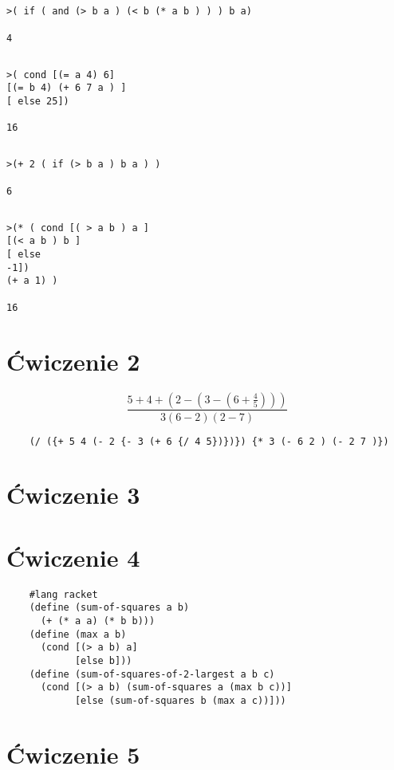\documentclass[a4paper]{article}
\begin{document}
\subsection{}
\begin{lstlisting}
>( if ( and (> b a ) (< b (* a b ) ) ) b a)

4
\end{lstlisting}
\subsection{}
\begin{lstlisting}
>( cond [(= a 4) 6]
[(= b 4) (+ 6 7 a ) ]
[ else 25])

16
\end{lstlisting}
\subsection{}
\begin{lstlisting}
>(+ 2 ( if (> b a ) b a ) )

6
\end{lstlisting}
\subsection{}
\begin{lstlisting}
>(* ( cond [( > a b ) a ]
[(< a b ) b ]
[ else
-1])
(+ a 1) )

16
\end{lstlisting}

\section{Ćwiczenie 2}
\begin{center}
    $$ \frac{5+4+(2-(3-(6+\frac{4}{5})))}{3(6-2)(2-7)} $$
\begin{lstlisting}
    (/ ({+ 5 4 (- 2 {- 3 (+ 6 {/ 4 5})})}) {* 3 (- 6 2 ) (- 2 7 )})
\end{lstlisting}
\end{center}
\section{Ćwiczenie 3}
\clearpage
\section{Ćwiczenie 4}
\begin{lstlisting}
    #lang racket
    (define (sum-of-squares a b)
      (+ (* a a) (* b b)))
    (define (max a b)
      (cond [(> a b) a]
            [else b]))
    (define (sum-of-squares-of-2-largest a b c)
      (cond [(> a b) (sum-of-squares a (max b c))]
            [else (sum-of-squares b (max a c))]))
\end{lstlisting}
\section{Ćwiczenie 5}
\end{document}
